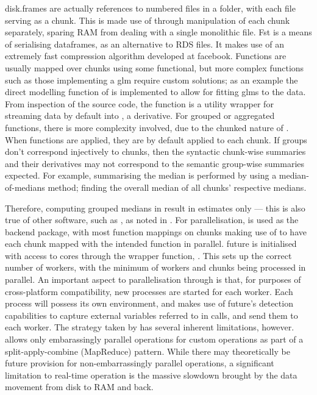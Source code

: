 disk.frames are actually references to numbered  files in a
folder, with each file serving as a chunk.
This is made use of through manipulation of each chunk separately,
sparing RAM from dealing with a single monolithic
file\cite{zj19:_inges_data}.
Fst is a means of serialising dataframes, as an alternative to RDS
files\cite{klik19}.
It makes use of an extremely fast compression algorithm developed at
facebook.
Functions are usually mapped over chunks using some functional, but more
complex functions such as those implementing a glm require custom
solutions; as an example the direct modelling function of
 is implemented to allow
for fitting glms to the data.
From inspection of the source code, the function is a utility wrapper
for streaming  data by default into , a 
derivative.
For grouped or aggregated functions, there is more complexity involved,
due to the chunked nature of .
When functions are applied, they are by default applied to each chunk.
If groups don't correspond injectively to chunks, then the syntactic
chunk-wise summaries and their derivatives may not correspond to the
semantic group-wise summaries expected.
For example, summarising the median is performed by using a
median-of-medians method; finding the overall median of all chunks'
respective medians.

Therefore, computing grouped medians in  result in estimates
only --- this is also true of other software, such as , as noted in
\cite{zj19:_group_by}.
For parallelisation,  is used as the backend package, with most
function mappings on chunks making use of
to have each chunk mapped with the intended function in parallel.
future is initialised with access to cores through the wrapper function,
\cite{zj19:_key}.
This sets up the correct number of workers, with the minimum of workers
and chunks being processed in parallel.
An important aspect to parallelisation through  is that, for
purposes of cross-platform compatibility, new \R{} processes are started
for each worker\cite{zj19:_using}.
Each process will possess its own environment, and  makes use
of future's detection capabilities to capture external variables
referred to in calls, and send them to each worker.
The strategy taken by  has several inherent
limitations, however.  allows only embarassingly
parallel operations for custom operations as part of a
split-apply-combine (MapReduce) pattern.
While there may theoretically be future provision for non-embarrassingly
parallel operations, a significant limitation to real-time operation is
the massive slowdown brought by the data movement from disk to RAM and
back.

